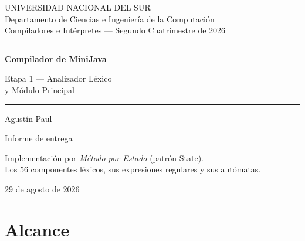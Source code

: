 \documentclass[11pt,a4paper]{article}
\begin{document}
\begin{titlepage}
\thispagestyle{empty}
\raggedright
\vspace*{2.2cm}

{\color{grisMedio}\footnotesize\sffamily
UNIVERSIDAD NACIONAL DEL SUR\\
Departamento de Ciencias e Ingeniería de la Computación\\
Compiladores e Intérpretes --- Segundo Cuatrimestre de 2026\par}

\vspace{2.4cm}
{\color{grisSuave}\rule{\textwidth}{0.6pt}}
\vspace{1.1cm}

{\Huge\bfseries\color{acento} Compilador de MiniJava\par}
\vspace{0.5cm}
{\LARGE\color{tinta} Etapa 1 --- Analizador Léxico\\[0.25cm]
\large\color{grisMedio} y Módulo Principal\par}

\vspace{1.1cm}
{\color{grisSuave}\rule{\textwidth}{0.6pt}}

\vspace{2.6cm}
{\large\color{tinta} Agustín Paul\par}
\vspace{0.35cm}
{\color{grisMedio} Informe de entrega\par}

\vfill
{\color{grisMedio}\footnotesize
Implementación por \emph{Método por Estado} (patrón State).\\
Los 56 componentes léxicos, sus expresiones regulares y sus autómatas.\par}
\vspace{0.6cm}
{\color{grisMedio}\footnotesize 29 de agosto de 2026\par}
\end{titlepage}

\thispagestyle{empty}
\tableofcontents
\newpage
\setcounter{page}{1}

\section{Alcance}
\end{document}
